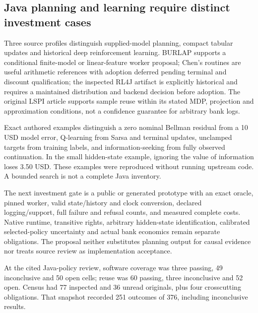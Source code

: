 \hypertarget{java-planning-and-learning-require-distinct-investment-cases}{%
\subsection{Java planning and learning require distinct investment
cases}\label{java-planning-and-learning-require-distinct-investment-cases}}

Three source profiles distinguish supplied-model planning, compact
tabular updates and historical deep reinforcement learning. BURLAP
supports a conditional finite-model or linear-feature worker proposal;
Chen's routines are useful arithmetic references with adoption deferred
pending terminal and discount qualification; the inspected RL4J artifact
is explicitly historical and requires a maintained distribution and
backend decision before adoption. The original LSPI article supports
sample reuse within its stated MDP, projection and approximation
conditions, not a confidence guarantee for arbitrary bank logs.
\citep{exec24_policyjava_burlap,exec24_policyjava_chen,exec24_policyjava_rl4j,exec24_policyjava_lspi}

Exact authored examples distinguish a zero nominal Bellman residual from
a 10 USD model error, Q-learning from Sarsa and terminal updates,
unclamped targets from training labels, and information-seeking from
fully observed continuation. In the small hidden-state example, ignoring
the value of information loses 3.50 USD. These examples were reproduced
without running upstream code. A bounded search is not a complete Java
inventory. \citep{exec24_policyjava_comparison}

The next investment gate is a public or generated prototype with an
exact oracle, pinned worker, valid state/history and clock conversion,
declared logging/support, full failure and refusal counts, and measured
complete costs. Native runtime, transitive rights, arbitrary
hidden-state identification, calibrated selected-policy uncertainty and
actual bank economics remain separate obligations. The proposal neither
substitutes planning output for causal evidence nor treats source review
as implementation acceptance. \citep{exec24_policyjava_comparison}

At the cited Java-policy review, software coverage was three passing, 49
inconclusive and 50 open cells; reuse was 60 passing, three inconclusive
and 52 open. Census had 77 inspected and 36 unread originals, plus four
crosscutting obligations. That snapshot recorded 251 outcomes of 376,
including inconclusive results.
\citep{sp24policiesjava_reader,sp24policiesjava_progress}

